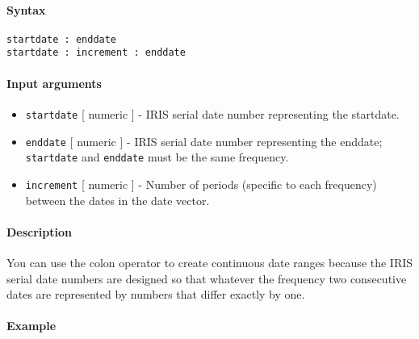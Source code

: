 


	\paragraph{Syntax}\label{syntax}

\begin{verbatim}
startdate : enddate
startdate : increment : enddate
\end{verbatim}

\paragraph{Input arguments}\label{input-arguments}

\begin{itemize}
\item
  \texttt{startdate} {[} numeric {]} - IRIS serial date number
  representing the startdate.
\item
  \texttt{enddate} {[} numeric {]} - IRIS serial date number
  representing the enddate; \texttt{startdate} and \texttt{enddate} must
  be the same frequency.
\item
  \texttt{increment} {[} numeric {]} - Number of periods (specific to
  each frequency) between the dates in the date vector.
\end{itemize}

\paragraph{Description}\label{description}

You can use the colon operator to create continuous date ranges because
the IRIS serial date numbers are designed so that whatever the frequency
two consecutive dates are represented by numbers that differ exactly by
one.

\paragraph{Example}\label{example}


